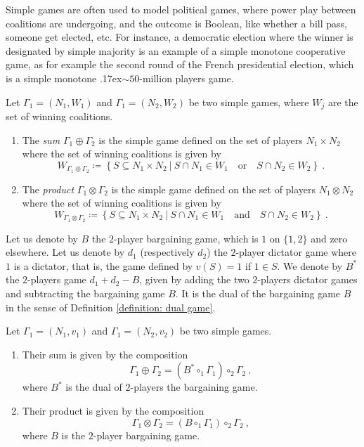 \documentclass[a4paper,12pt]{amsart}
\begin{document}
\begin{example}
Simple games are often used to model political games, where power play between coalitions are undergoing, and the outcome is Boolean, like whether a bill pass, someone get elected, etc. For instance, a democratic election where the winner is designated by simple majority is an example of a simple monotone cooperative game, as for example the second round of the French presidential election, which is a simple monotone {\raise.17ex\hbox{$\scriptstyle\sim$}}$50$-million players game. 
\end{example}

\begin{definition}
Let $\Gamma_1 = (N_1,W_1)$ and $\Gamma_1 = (N_2,W_2)$ be two simple games, where $W_j$ are the set of winning coalitions. 
\begin{enumerate}
\item The \textit{sum} $\Gamma_1 \oplus \Gamma_2$ is the simple game defined on the set of players $N_1 \times N_2$ where the set of winning coalitions is given by 
\[
W_{\Gamma_1 \oplus \Gamma_2} \coloneqq \left\{S \subseteq N_1 \times N_2 ~ | ~ S \cap N_1 \in W_1 \quad \text{or} \quad S \cap N_2 \in W_2 \right\}~. 
\]
\item The \textit{product} $\Gamma_1 \otimes \Gamma_2$ is the simple game defined on the set of players $N_1 \otimes N_2$ where the set of winning coalitions is given by 
\[
W_{\Gamma_1 \otimes \Gamma_2} \coloneqq \left\{S \subseteq N_1 \times N_2~ | ~ S \cap N_1 \in W_1 \quad \text{and} \quad S \cap N_2 \in W_2 \right\}~. 
\]
\end{enumerate}
\end{definition}

Let us denote by $B$ the $2$-player bargaining game, which is $1$ on $\{1,2\}$ and zero elsewhere. Let us denote by $d_1$ (respectively $d_2$) the $2$-player dictator game where $1$ is a dictator, that is, the game defined by $v(S) = 1$ if $1 \in S$. We denote by $B^*$ the $2$-players game $d_1 + d_2 -B$, given by adding the two $2$-players dictator games and subtracting the bargaining game $B$. It is the dual of the bargaining game $B$ in the sense of Definition \ref{definition: dual game}. 

\begin{proposition}
Let $\Gamma_1 = (N_1,v_1)$ and $\Gamma_1 = (N_2,v_2)$ be two simple games. 

\begin{enumerate}

\item Their sum is given by the composition 
\[
\Gamma_1 \oplus \Gamma_2 = (B^* \circ_1 \Gamma_1) \circ_2 \Gamma_2~,
\]
where $B^*$ is the dual of $2$-players the bargaining game. 

\item Their product is given by the composition 
\[
\Gamma_1 \otimes \Gamma_2 = (B \circ_1 \Gamma_1) \circ_2 \Gamma_2~,
\]
where $B$ is the $2$-player bargaining game. 

\end{enumerate}
\end{proposition}
\end{document}

